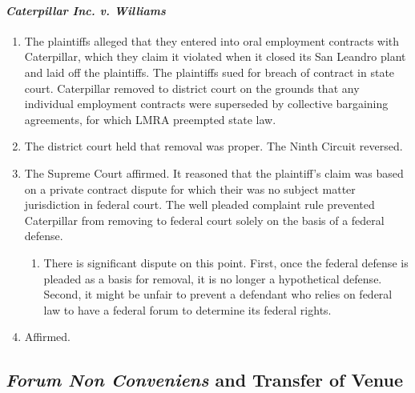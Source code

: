 \paragraph{\emph{Caterpillar Inc. v. Williams}}

\begin{enumerate}
    \item The plaintiffs alleged that they entered into oral employment 
    contracts with Caterpillar, which they claim it violated when it closed 
    its San Leandro plant and laid off the plaintiffs. The plaintiffs sued for 
    breach of contract in state court. Caterpillar removed to district court 
    on the grounds that any individual employment contracts were superseded by 
    collective bargaining agreements, for which LMRA preempted state law.
    \item The district court held that removal was proper. The Ninth Circuit 
    reversed.
    \item The Supreme Court affirmed. It reasoned that the plaintiff's claim 
    was based on a private contract dispute for which their was no subject 
    matter jurisdiction in federal court. The well pleaded complaint rule 
    prevented Caterpillar from removing to federal court solely on the basis 
    of a federal defense.
    \begin{enumerate}
        \item There is significant dispute on this point. First, once the 
        federal defense is pleaded as a basis for removal, it is no longer a 
        hypothetical defense. Second, it might be unfair to prevent a 
        defendant who relies on federal law to have a federal forum to 
        determine its federal rights.
    \end{enumerate}
    \item Affirmed.
\end{enumerate}

\subsection{\emph{Forum Non Conveniens} and Transfer of Venue}

